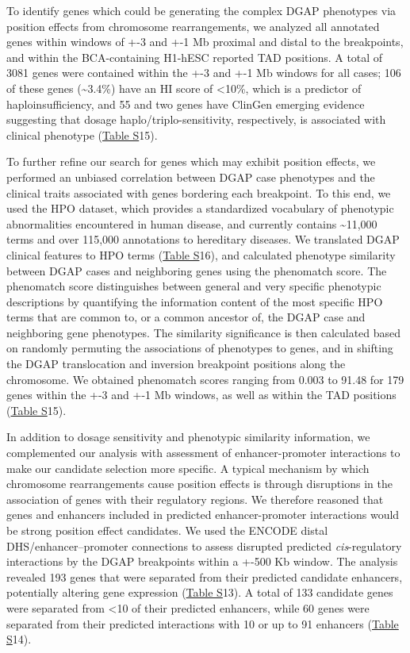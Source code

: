 \documentclass[a4paper,twoside=true,openright,parskip=full,chapterprefix=true,11pt,headings=normal,bibliography=totoc,listof=totoc,titlepage=on,captions=tableabove,draft=false]{scrreprt}
\theoremstyle{definition}
\theoremstyle{definition}
\theoremstyle{definition}
\theoremstyle{remark}
\begin{document}
To identify genes which could be generating the complex DGAP phenotypes
via position effects from chromosome rearrangements, we analyzed all
annotated genes within windows of +-3 and +-1 Mb proximal and distal to
the breakpoints, and within the BCA-containing H1-hESC reported TAD
positions. A total of 3081 genes were contained within the +-3 and +-1
Mb windows for all cases; 106 of these genes (\textasciitilde{}3.4\%)
have an HI score of \textless{}10\%, which is a predictor of
haploinsufficiency,\citep{Huang2010} and 55 and two genes have ClinGen
emerging evidence suggesting that dosage haplo/triplo-sensitivity,
respectively, is associated with clinical phenotype
(\protect\hyperlink{position-effect-sub-tab}{Table S}15).

To further refine our search for genes which may exhibit position
effects, we performed an unbiased correlation between DGAP case
phenotypes and the clinical traits associated with genes bordering each
breakpoint. To this end, we used the HPO dataset,\citep{Kohler2014}
which provides a standardized vocabulary of phenotypic abnormalities
encountered in human disease, and currently contains
\textasciitilde{}11,000 terms and over 115,000 annotations to hereditary
diseases. We translated DGAP clinical features to HPO terms
(\protect\hyperlink{position-effect-sub-tab}{Table S}16), and calculated
phenotype similarity between DGAP cases and neighboring genes using the
phenomatch score.\citep{Ibn-Salem2014} The phenomatch score
distinguishes between general and very specific phenotypic descriptions
by quantifying the information content of the most speciﬁc HPO terms
that are common to, or a common ancestor of, the DGAP case and
neighboring gene phenotypes. The similarity significance is then
calculated based on randomly permuting the associations of phenotypes to
genes, and in shifting the DGAP translocation and inversion breakpoint
positions along the chromosome. We obtained phenomatch scores ranging
from 0.003 to 91.48 for 179 genes within the +-3 and +-1 Mb windows, as
well as within the TAD positions
(\protect\hyperlink{position-effect-sub-tab}{Table S}15).

In addition to dosage sensitivity and phenotypic similarity information,
we complemented our analysis with assessment of enhancer-promoter
interactions to make our candidate selection more specific. A typical
mechanism by which chromosome rearrangements cause position effects is
through disruptions in the association of genes with their regulatory
regions.\citep{Kleinjan2005, Kleinjan1998} We therefore reasoned that
genes and enhancers included in predicted enhancer-promoter interactions
would be strong position effect candidates. We used the ENCODE distal
DHS/enhancer--promoter connections\citep{Thurman2012} to assess
disrupted predicted \emph{cis}-regulatory interactions by the DGAP
breakpoints within a +-500 Kb window. The analysis revealed 193 genes
that were separated from their predicted candidate enhancers,
potentially altering gene expression
(\protect\hyperlink{position-effect-sub-tab}{Table S}13). A total of 133
candidate genes were separated from \textless{}10 of their predicted
enhancers, while 60 genes were separated from their predicted
interactions with 10 or up to 91 enhancers
(\protect\hyperlink{position-effect-sub-tab}{Table S}14).
\end{document}
